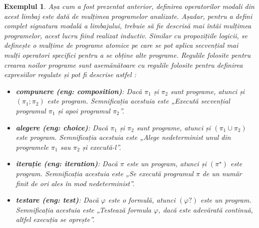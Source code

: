 \documentclass[12pt, openany]{book}
\newtheorem{example}[definition]{Exemplul} %
\newcommand{\myenglishterm}[1]{(\textit{eng: #1})}
\begin{document}
\begin{example}
                Așa cum a fost prezentat anterior, definirea operatorilor modali din acest limbaj este dată de mulțimea 
                programelor analizate. Așadar, pentru a defini complet signatura modală a limbajului, trebuie să fie 
                descrisă mai întâi mulțimea programelor, acest lucru fiind realizat inductiv. Similar cu propozițiile logicii,
                se definește o mulțime de programe atomice pe care se pot aplica secvențial mai mulți operatori 
                specifici pentru a se obține alte programe. Regulile folosite pentru crearea noilor programe sunt 
                asemănătoare cu regulile folosite pentru definirea expresiilor regulate și pot fi descrise astfel 
                \cite{dynamic_logic}:
                \begin{itemize}
                    \item [] \textbf{compunere \myenglishterm{composition}}: Dacă $\pi_1$ și $\pi_2$ sunt programe, 
                    atunci și $(\pi_1; \pi_2)$ este program. Semnificația acestuia este „Execută secvențial programul 
                    $\pi_1$ și apoi programul $\pi_2$”. 
                    \item [] \textbf{alegere \myenglishterm{choice}}: Dacă $\pi_1$ și $\pi_2$ sunt programe, 
                    atunci și $(\pi_1 \cup \pi_2)$ este program. Semnificația acestuia este „Alege nedeterminist unul 
                    din programele $\pi_1$ sau $\pi_2$ și execută-l”. 
                    \item [] \textbf{iterație \myenglishterm{iteration}}: Dacă $\pi$ este un program, atunci și 
                    $(\pi^\star)$ este program. Semnificația acestuia este „Se execută programul $\pi$ de un număr finit 
                    de ori ales în mod nedeterminist”.
                    \item [] \textbf{testare \myenglishterm{test}}: Dacă $\varphi$ este o formulă, atunci $(\varphi?)$ 
                    este un program. Semnificația acestuia este „Testează formula $\varphi$, dacă este adevărată 
                    continuă, altfel execuția se oprește”.
                \end{itemize}


\end{example}
\end{document}
